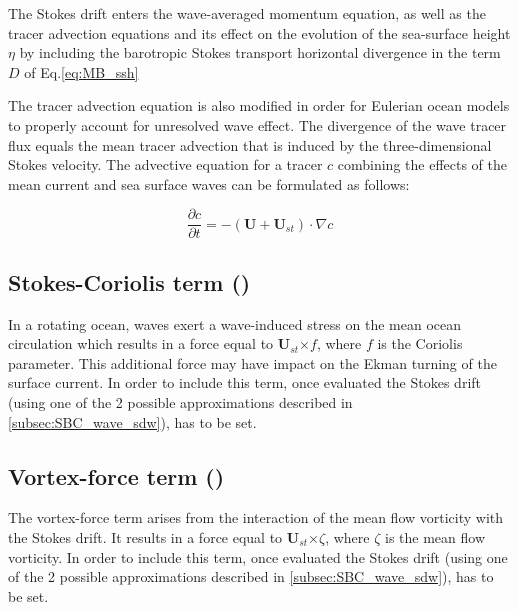 \documentclass[../main/NEMO_manual]{subfiles}
\begin{document}
The Stokes drift enters the wave-averaged momentum equation, as well as the tracer advection equations
and its effect on the evolution of the sea-surface height ${\eta}$ by including the barotropic Stokes transport horizontal divergence in the term $D$ of Eq.\ref{eq:MB_ssh}

The tracer advection equation is also modified in order for Eulerian ocean models to properly account
for unresolved wave effect. The divergence of the wave tracer flux equals the mean tracer advection
that is induced by the three-dimensional Stokes velocity.
The advective equation for a tracer $c$ combining the effects of the mean current and sea surface waves
can be formulated as follows:

\[
  \frac{\partial{c}}{\partial{t}} =
  - (\mathbf{U} + \mathbf{U}_{st}) \cdot \nabla{c}
\]

\subsection[Stokes-Coriolis term (\forcode{ln_stcor})]{Stokes-Coriolis term (\protect{})}
\label{subsec:SBC_wave_stcor}

In a rotating ocean, waves exert a wave-induced stress on the mean ocean circulation which results
in a force equal to $\mathbf{U}_{st}$×$f$, where $f$ is the Coriolis parameter.
This additional force may have impact on the Ekman turning of the surface current.
In order to include this term, once evaluated the Stokes drift (using one of the 2 possible
approximations described in \autoref{subsec:SBC_wave_sdw}),
 has to be set.


\subsection[Vortex-force term (\forcode{ln_vortex_force})]{Vortex-force term (\protect{})}
\label{subsec:SBC_wave_vf}

The vortex-force term arises from the interaction of the mean flow vorticity with the Stokes drift. 
It results in a force equal to $\mathbf{U}_{st}$×$\zeta$, where $\zeta$ is the mean flow vorticity.
In order to include this term, once evaluated the Stokes drift (using one of the 2 possible
approximations described in \autoref{subsec:SBC_wave_sdw}),  has to be set.
\end{document}
